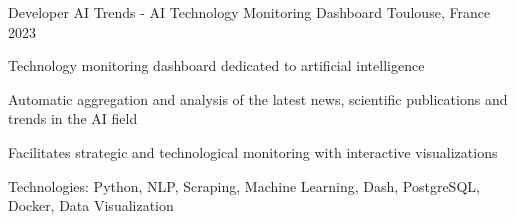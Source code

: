 \begin{cventries}

\cventry
{Developer} %
{AI Trends - AI Technology Monitoring Dashboard} %
{Toulouse, France} %
{2023} %
{ %
\begin{cvitems}
\item {Technology monitoring dashboard dedicated to artificial intelligence}
\item {Automatic aggregation and analysis of the latest news, scientific publications and trends in the AI field}
\item {Facilitates strategic and technological monitoring with interactive visualizations}
\item {Technologies: Python, NLP, Scraping, Machine Learning, Dash, PostgreSQL, Docker, Data Visualization}
\end{cvitems}
}


\end{cventries}
